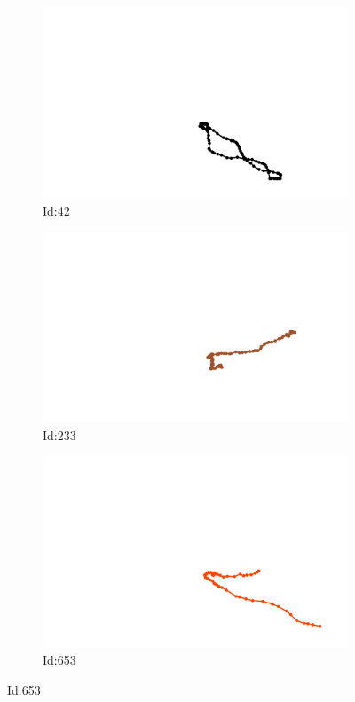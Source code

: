 \documentclass[12pt,twoside]{report}
\begin{document}
\begin{figure}
\centering
\begin{subfigure}[b]{0.20\textwidth}
\centering
\includegraphics[width=\textwidth]{../../trajectories/42.png}
\caption{Id:42}
\end{subfigure}
\begin{subfigure}[b]{0.20\textwidth}
\centering
\includegraphics[width=\textwidth]{../../trajectories/233.png}
\caption{Id:233}
\end{subfigure}
\begin{subfigure}[b]{0.20\textwidth}
\centering
\includegraphics[width=\textwidth]{../../trajectories/653.png}
\caption{Id:653}
\end{subfigure}
\end{figure}
\end{document}
